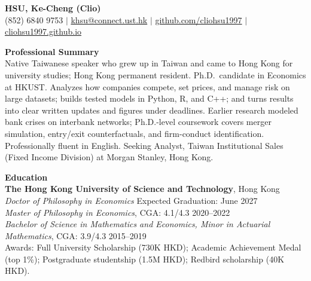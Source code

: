 \documentclass[11pt,letterpaper]{article}
\begin{document}
{\Large \textbf{HSU, Ke-Cheng (Clio)}}\\[2pt]
(852) 6840 9753 \quad $|$ \quad \href{mailto:khsu@connect.ust.hk}{khsu@connect.ust.hk} \quad $|$ \quad \href{https://github.com/cliohsu1997}{github.com/cliohsu1997} \quad $|$ \quad \href{https://cliohsu1997.github.io/}{cliohsu1997.github.io}

\vspace{1pt}

{\large \textbf{Professional Summary}}\\[1pt]
Native Taiwanese speaker who grew up in Taiwan and came to Hong Kong for university studies; Hong Kong permanent resident. Ph.D.\ candidate in Economics at HKUST. Analyzes how companies compete, set prices, and manage risk on large datasets; builds tested models in Python, R, and C++; and turns results into clear written updates and figures under deadlines. Earlier research modeled bank crises on interbank networks; Ph.D.-level coursework covers merger simulation, entry/exit counterfactuals, and firm-conduct identification. Professionally fluent in English. Seeking Analyst, Taiwan Institutional Sales (Fixed Income Division) at Morgan Stanley, Hong Kong.

\vspace{1pt}

{\large \textbf{Education}}\\[1pt]
\textbf{The Hong Kong University of Science and Technology}, Hong Kong\\
\textit{Doctor of Philosophy in Economics} \hfill Expected Graduation: June 2027\\
\textit{Master of Philosophy in Economics}, CGA: 4.1/4.3 \hfill 2020--2022\\
\textit{Bachelor of Science in Mathematics and Economics, Minor in Actuarial Mathematics}, CGA: 3.9/4.3 \hfill 2015--2019\\
Awards: Full University Scholarship (730K HKD); Academic Achievement Medal (top 1\%); Postgraduate studentship (1.5M HKD); Redbird scholarship (40K HKD).

\vspace{1pt}
\end{document}

